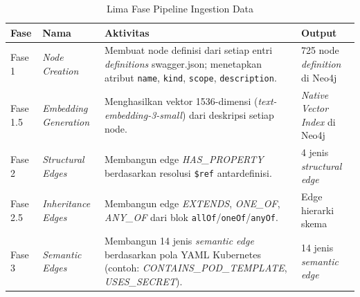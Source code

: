 ﻿\renewcommand{\arraystretch}{1.3}
\captionsetup[table]{justification=raggedright,singlelinecheck=false}
\begin{table}[H]
\caption{Lima Fase Pipeline Ingestion Data}
\label{tbl:ingestion_pipeline}
\centering
\begin{tabular}{|p{}|p{}|p{}|p{}|}
\hline
\textbf{Fase} & \textbf{Nama} & \textbf{Aktivitas} & \textbf{Output} \\
\hline
Fase 1 & \textit{Node Creation} & Membuat node definisi dari setiap entri \textit{definitions} swagger.json; menetapkan atribut \texttt{name}, \texttt{kind}, \texttt{scope}, \texttt{description}. & 725 node \textit{definition} di Neo4j \\
\hline
Fase 1.5 & \textit{Embedding Generation} & Menghasilkan vektor 1536-dimensi (\textit{text-embedding-3-small}) dari deskripsi setiap node. & \textit{Native Vector Index} di Neo4j \\
\hline
Fase 2 & \textit{Structural Edges} & Membangun edge \textit{HAS\_PROPERTY} berdasarkan resolusi \texttt{\$ref} antardefinisi. & 4 jenis \textit{structural edge} \\
\hline
Fase 2.5 & \textit{Inheritance Edges} & Membangun edge \textit{EXTENDS}, \textit{ONE\_OF}, \textit{ANY\_OF} dari blok \texttt{allOf}/\texttt{oneOf}/\texttt{anyOf}. & Edge hierarki skema \\
\hline
Fase 3 & \textit{Semantic Edges} & Membangun 14 jenis \textit{semantic edge} berdasarkan pola YAML Kubernetes (contoh: \textit{CONTAINS\_POD\_TEMPLATE}, \textit{USES\_SECRET}). & 14 jenis \textit{semantic edge} \\
\hline
\end{tabular}
\end{table}